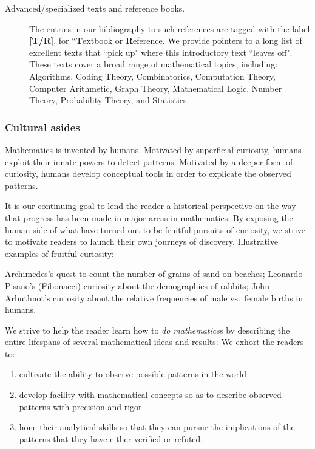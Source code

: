 \begin{description}
\medskip\item[{\sc Advanced/specialized texts and reference books}.]
The entries in our bibliography to such references are tagged with the label {\bf [T/R]}, for ``{\bf T}extbook or {\bf R}eference.  We provide pointers to a long list of excellent texts that ``pick up" where this introductory text ``leaves off".  These texts cover a broad range of mathematical topics, including: Algorithms, Coding Theory, Combinatorics, Computation Theory, Computer Arithmetic, Graph Theory, Mathematical Logic, Number Theory, Probability Theory, and Statistics.
\end{description}


\subsubsection{Cultural asides}

Mathematics is invented by humans.  Motivated by superficial curiosity, humans exploit their innate powers to detect patterns.  Motivated by a deeper form of curiosity, humans develop conceptual tools in order to explicate the observed patterns.

\smallskip

It is our continuing goal to lend the reader a historical perspective on the way that progress has been made in major areas in mathematics.  By exposing the human side of what have turned out to be fruitful pursuits of curiosity, we strive to motivate readers to launch their own journeys of discovery.  Illustrative examples of fruitful curiosity:

Archimedes's quest to count the number of grains of sand on beaches; Leonardo Pisano's (Fibonacci) curiosity about the demographics of rabbits; John Arbuthnot's curiosity about the relative frequencies of male vs.~female births in humans. 

\smallskip

We strive to help the reader learn how to {\em do mathematics}s by describing the entire lifespans of several mathematical ideas and results:  We exhort the readers to:
\begin{enumerate}
\item
cultivate the ability to observe possible patterns in the world
\medskip\item
develop facility with mathematical concepts so as to describe observed patterns with precision and rigor
\medskip\item
hone their analytical skills so that they can pursue the implications of the patterns that they have either verified or refuted.
\end{enumerate}

